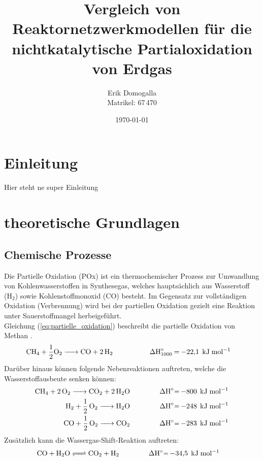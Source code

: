 \documentclass[footmark=none]{tubaf-thesis}
\title{Vergleich von Reaktornetzwerkmodellen für die nichtkatalytische Partialoxidation von Erdgas}
\author{Erik Domogalla\\{\small Matrikel: 67\,470}}
\date{\today}
\begin{document}

    \maketitle
    \tableofcontents
    \listoffigures
    
    \clearpage
    \chapter{Einleitung}
        Hier steht ne super Einleitung 
    \chapter{theoretische Grundlagen}
        \section{Chemische Prozesse}
        \label{sec:chem_prozesse}
        Die Partielle Oxidation (POx) ist ein thermochemischer Prozess zur Umwandlung von Kohlenwasserstoffen in Synthesegas, welches hauptsächlich aus Wasserstoff (H$_2$) sowie Kohlenstoffmonoxid (CO) besteht. Im Gegensatz zur vollständigen Oxidation (Verbrennung) wird bei der partiellen Oxidation gezielt eine Reaktion unter Sauerstoffmangel herbeigeführt.\\
        Gleichung (\ref{eq:partielle_oxidation}) beschreibt die partielle Oxidation von Methan \cite{POX_Erdgas}. 
        \begin{align}
            \ce{CH4 + \frac{1}{2}O2 -> CO + 2H2 \qquad \qquad\quad &\Delta H^\circ_{1000} = -22,1\;\mathrm{kJ\;mol^{-1}}} \label{eq:partielle_oxidation}
        \end{align}
        Darüber hinaus können folgende Nebenreaktionen auftreten, welche die Wasserstoffausbeute senken können:
        \begin{align}
            \ce{CH4 + 2O2 ->  CO2 + 2H2O \qquad \qquad  &\Delta H^\circ = -800\;\mathrm{kJ\;mol^{-1}}} \label{eq:vollständige_oxidation}\\ 
            \ce{H2 + 1/2O2 -> H2O \qquad \qquad  &\Delta H^\circ = -248\;\mathrm{kJ\;mol^{-1}}} \\
            \ce{CO + 1/2 O2 -> CO2 \qquad \qquad  &\Delta H^\circ = -283\;\mathrm{kJ\;mol^{-1}}}
        \end{align}
        Zusätzlich kann die Wassergas-Shift-Reaktion auftreten:
        \begin{align}
            \ce{CO + H2O <=> CO2 + H2 \qquad \qquad  &\Delta H^\circ = -34,5\;\mathrm{kJ\;mol^{-1}}}
        \end{align}
\end{document}
